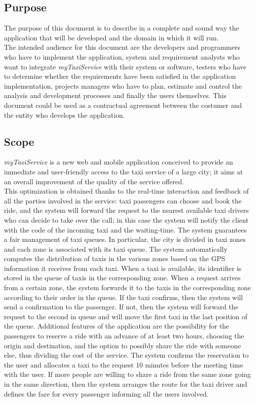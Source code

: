 \documentclass[a4paper,11pt]{report} %
\newcommand{\mts}{\mbox{\normalfont\itshape myTaxiService}}
\begin{document}
	\subsection{Purpose} The purpose of this document is to describe in a complete and sound way
	the  application that will be developed and the domain in which it will run.\\
	The intended audience for this document are the developers and programmers
	who have to implement the application, system and requirement
	analysts who want to integrate \mts{} with their system or software,
	testers who have to determine whether the requirements have been satisfied in
	the application implementation, projects managers who have to plan, estimate
	and control the analysis and development processes and finally the users themselves.
	This document could be used as a contractual agreement between the costumer
	and the entity who develops the application.
	
	\subsection{Scope} \label{sec:scope}
	\mts{} is a new web and mobile application conceived to provide an immediate and user-friendly access to the taxi service of a large city; it aims at an overall improvement of the quality of the service offered.\\
	This optimization is obtained thanks to the real-time interaction and feedback of all the parties involved in the service: taxi passengers can choose and book the ride, and the system will forward the request to the nearest available taxi drivers who can decide to take over the call; in this case the system will notify the client with the code of the incoming taxi and the waiting-time.
	The	system	guarantees a fair management of taxi queues. In particular, the city is divided in taxi zones and each zone is associated with its taxi queue. The system automatically computes the distribution of taxis in the various zones based on the GPS information it receives from each taxi. When a taxi is available, its identifier is stored in the queue of taxis in the corresponding zone. When a request arrives from a certain zone, the system forwards it to the taxis in the corresponding zone according to their order in the queue. If the taxi confirms, then the system will send a confirmation to the passenger. If not, then the system will forward the request to the second in queue and will move the first taxi in the last position of the queue.
	Additional features of the application are the possibility for the passengers to reserve a ride with an advance of at least two hours, choosing the origin and destination, and the option to possibly share the ride with someone else, thus dividing the cost of the service. The system confirms the reservation to the user and allocates a taxi to the request 10 minutes before the meeting time with the user. If more people are willing to share a ride from the same zone going in the same direction, then the system arranges the route for the taxi driver and defines the fare for every passenger informing all the users involved. 
	
\end{document}
